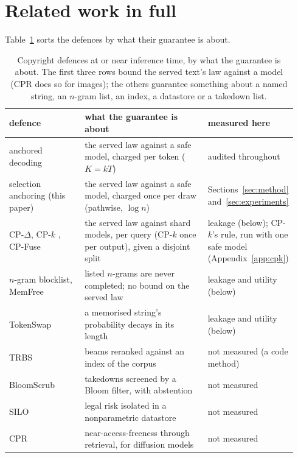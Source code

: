 
\section{Related work in full}\label{app:related}
Table~\ref{tab:related} sorts the defences by what their guarantee is about.


\begin{table}[ht]
\centering\footnotesize
\caption{Copyright defences at or near inference time, by what the guarantee is about. The first three
rows bound the served text's law against a model (CPR does so for images); the others guarantee something
about a named string, an $n$-gram list, an index, a datastore or a takedown list.}
\label{tab:related}
\begin{tabular}{@{}p{0.27\linewidth}p{0.45\linewidth}p{0.22\linewidth}@{}}
\toprule
defence & what the guarantee is about & measured here \\
\midrule
anchored decoding \citep{he2026anchored} & the served law against a safe model, charged per token ($K = kT$) & audited throughout \\
selection anchoring (this paper) & the served law against a safe model, charged once per draw (pathwise, $\log n$) & Sections~\ref{sec:method} and~\ref{sec:experiments} \\
CP-$\Delta$, CP-$k$ \citep{vyas2023provable}, CP-Fuse \citep{abad2025cpfuse} & the served law against shard models, per query (CP-$k$ once per output), given a disjoint split & leakage (below); CP-$k$'s rule, run with one safe model (Appendix~\ref{app:cpk}) \\
$n$-gram blocklist, MemFree \citep{ippolito2023preventing} & listed $n$-grams are never completed; no bound on the served law & leakage and utility (below) \\
TokenSwap \citep{prashant2025tokenswap} & a memorised string's probability decays in its length & leakage and utility (below) \\
TRBS \citep{fu2026duplicate} & beams reranked against an index of the corpus & not measured (a code method) \\
BloomScrub \citep{zhang2025bloomscrub} & takedowns screened by a Bloom filter, with abstention & not measured \\
SILO \citep{min2024silo} & legal risk isolated in a nonparametric datastore & not measured \\
CPR \citep{golatkar2024cpr} & near-access-freeness through retrieval, for diffusion models & not measured \\
\bottomrule
\end{tabular}
\end{table}

